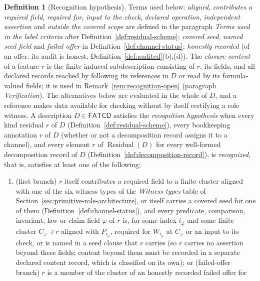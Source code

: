 \documentclass[11pt]{article}
\theoremstyle{definition}
\newtheorem{definition}[theorem]{Definition}
\newcommand{\FATCD}{\ensuremath{\mathsf{FATCD}}}
\newcommand{\Residual}[1]{\ensuremath{\operatorname{Residual}\!\left(#1\right)}}
\begin{document}
\begin{definition}[Recognition hypothesis]\label{def:recognition-hypothesis}
Terms used below: \emph{aligned}, \emph{contributes a required field},
\emph{required for}, \emph{input to the check}, \emph{declared operation},
\emph{independent assertion} and \emph{outside the covered scope} are defined in
the paragraph \emph{Terms used in the label criteria} after
Definition~\ref{def:residual-scheme}; \emph{covered seed}, \emph{named seed
field} and \emph{failed offer} in Definition~\ref{def:channel-status};
\emph{honestly recorded} (of an offer: its audit is honest,
Definition~\ref{def:audited}(b),(d)).
The \emph{closure content} of a feature \(r\) is the finite induced
subdescription consisting of \(r\), its fields, and all declared records
reached by following its references in \(D\) or read by its formula-valued fields; it is used in
Remark~\ref{rem:recognition-open} (paragraph \emph{Verification}). The alternatives below are evaluated in the
whole of \(D\), and a reference makes data available for checking without by
itself certifying a role witness. A description \(D \in \FATCD{}\)
satisfies the \emph{recognition hypothesis} when every kind residual \(r\)
of \(D\) (Definition~\ref{def:residual-scheme}), every bookkeeping annotation \(r\) of \(D\) (whether or not a decomposition record assigns it to a channel), and every
element \(r\) of \(\Residual{D}\) for every well-formed decomposition record
of \(D\) (Definition~\ref{def:decomposition-record}), is \emph{recognized}, that is,
satisfies at least one of the following:
\begin{enumerate}[label=(R\arabic*),topsep=2pt,itemsep=1pt]
  \item (first branch) \(r\) itself contributes a required field to a finite cluster aligned
    with one of the six witness types of the \emph{Witness types} table of Section~\ref{sec:primitive-role-architecture},
    or itself carries a covered seed for one of them
    (Definition~\ref{def:channel-status}), and every predicate, comparison, invariant, law or claim field \(\varphi\) of \(r\) is, for some index \(i_\varphi\) and some finite cluster \(C_\varphi\ni r\) aligned with \(P_{i_\varphi}\), required for \(W_{i_\varphi}\) at \(C_\varphi\) or an input to its check, or is named in a seed clause that \(r\) carries (so \(r\) carries no assertion beyond these fields; content beyond them must be recorded in a separate declared content record, which is classified on its own); or (failed-offer branch)
    \(r\) is a member of the cluster of an honestly recorded failed offer for

\end{enumerate}
\end{definition}
\end{document}
